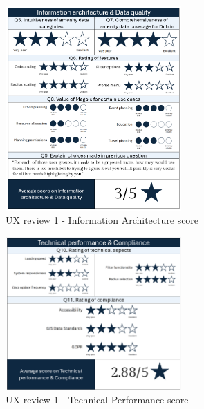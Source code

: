 \begin{figure}[h!]
    \centering
    \includegraphics[width=0.6\textwidth]{images/ux-survey1-data.png}
    \caption{UX review 1 - Information Architecture score}
    \label{fig:ux1datascore}
\end{figure}

\begin{figure}[h!]
    \centering
    \includegraphics[width=0.6\textwidth]{images/ux-survey1-technical.png}
    \caption{UX review 1 - Technical Performance score}
    \label{fig:ux1compliancescore}
\end{figure}

